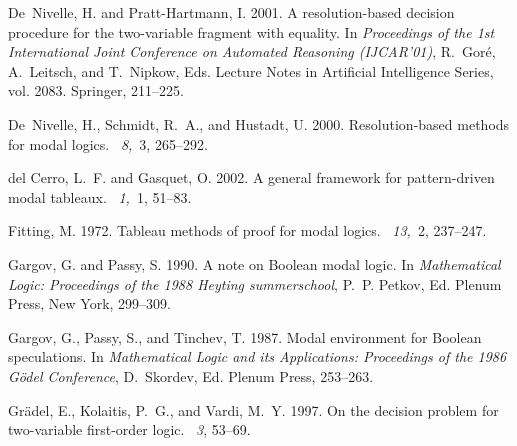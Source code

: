 \documentclass[leqno
,pdflatex
,prodmode
,acmtocl
]{acmsmall}
\begin{document}
\begin{thebibliography}{}
{\sc De~Nivelle, H.} {\sc and} {\sc Pratt-Hartmann, I.} 2001.
\newblock A resolution-based decision procedure for the two-variable fragment
  with equality.
\newblock In {\em Proceedings of the 1st International Joint Conference on
  Automated Reasoning ({IJCAR}'01)}, {R.~Gor{\'e}}, {A.~Leitsch}, {and}
  {T.~Nipkow}, Eds. Lecture Notes in Artificial Intelligence Series, vol. 2083.
  Springer, 211--225.

{\sc De~Nivelle, H.}, {\sc Schmidt, R.~A.}, {\sc and} {\sc Hustadt, U.} 2000.
\newblock Resolution-based methods for modal logics.
~{\em 8,\/}~3, 265--292.

{\sc del Cerro, L.~F.} {\sc and} {\sc Gasquet, O.} 2002.
\newblock A general framework for pattern-driven modal tableaux.
~{\em 1,\/}~1, 51--83.

{\sc Fitting, M.} 1972.
\newblock Tableau methods of proof for modal logics.
~{\em 13,\/}~2, 237--247.

{\sc Gargov, G.} {\sc and} {\sc Passy, S.} 1990.
\newblock A note on {Boolean} modal logic.
\newblock In {\em Mathematical Logic: Proceedings of the 1988 {H}eyting
  summerschool}, {P.~P. Petkov}, Ed. Plenum Press, New York, 299--309.

{\sc Gargov, G.}, {\sc Passy, S.}, {\sc and} {\sc Tinchev, T.} 1987.
\newblock Modal environment for {B}oolean speculations.
\newblock In {\em Mathematical Logic and its Applications: Proceedings of the
  1986 {G}{\"o}del Conference}, {D.~Skordev}, Ed. Plenum Press, 253--263.

{\sc Gr{\"a}del, E.}, {\sc Kolaitis, P.~G.}, {\sc and} {\sc Vardi, M.~Y.} 1997.
\newblock On the decision problem for two-variable first-order logic.
~{\em 3}, 53--69.


\end{thebibliography}
\end{document}

